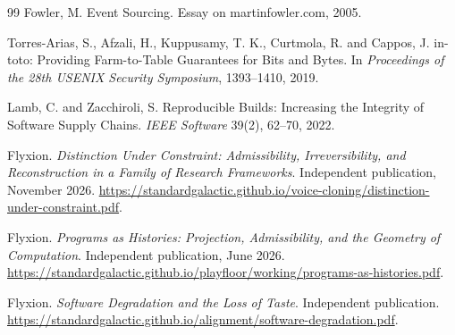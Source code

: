 \documentclass[11pt]{article}
\theoremstyle{remark}
\begin{document}
\begin{thebibliography}{99}
Fowler, M. Event Sourcing. Essay on martinfowler.com, 2005.

Torres-Arias, S., Afzali, H., Kuppusamy, T. K., Curtmola, R. and Cappos, J. in-toto: Providing Farm-to-Table Guarantees for Bits and Bytes. In \emph{Proceedings of the 28th USENIX Security Symposium}, 1393--1410, 2019.

Lamb, C. and Zacchiroli, S. Reproducible Builds: Increasing the Integrity of Software Supply Chains. \emph{IEEE Software} 39(2), 62--70, 2022.

Flyxion. \emph{Distinction Under Constraint: Admissibility, Irreversibility, and Reconstruction in a Family of Research Frameworks}. Independent publication, November 2026. \url{https://standardgalactic.github.io/voice-cloning/distinction-under-constraint.pdf}.

Flyxion. \emph{Programs as Histories: Projection, Admissibility, and the Geometry of Computation}. Independent publication, June 2026. \url{https://standardgalactic.github.io/playfloor/working/programs-as-histories.pdf}.

Flyxion. \emph{Software Degradation and the Loss of Taste}. Independent publication. \url{https://standardgalactic.github.io/alignment/software-degradation.pdf}.

\end{thebibliography}
\end{document}
